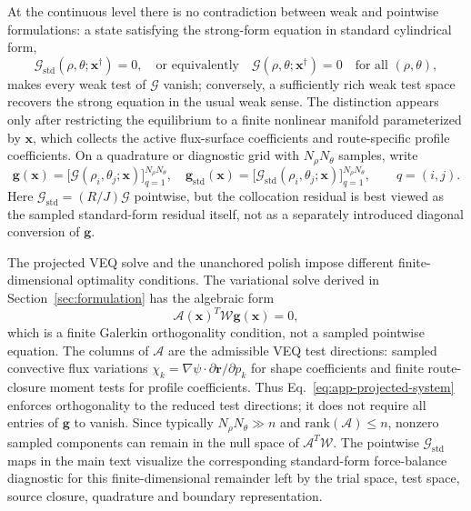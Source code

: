 \documentclass[final, 3p, times]{elsarticle}
\begin{document}
At the continuous level there is no contradiction between weak and pointwise formulations: a state satisfying the strong-form equation in standard cylindrical form,
\begin{equation*}
    \mathcal{G}_{\mathrm{std}}(\rho,\theta;\mathbf{x}^{\dagger})=0,
    \quad \text{or equivalently}\quad
    \mathcal{G}(\rho,\theta;\mathbf{x}^{\dagger})=0
    \quad \text{for all }(\rho,\theta),
\end{equation*}
makes every weak test of $\mathcal{G}$ vanish; conversely, a sufficiently rich weak test space recovers the strong equation in the usual weak sense. The distinction appears only after restricting the equilibrium to a finite nonlinear manifold parameterized by $\mathbf{x}$, which collects the active flux-surface coefficients and route-specific profile coefficients. On a quadrature or diagnostic grid with $N_\rho N_\theta$ samples, write
\begin{equation*}
    \mathbf{g}(\mathbf{x})
    =
    \bigl[\mathcal{G}(\rho_i,\theta_j;\mathbf{x})\bigr]_{q=1}^{N_\rho N_\theta},
    \quad
    \mathbf{g}_{\mathrm{std}}(\mathbf{x})
    =
    \bigl[\mathcal{G}_{\mathrm{std}}(\rho_i,\theta_j;\mathbf{x})\bigr]_{q=1}^{N_\rho N_\theta},
    \qquad q=(i,j).
\end{equation*}
Here $\mathcal{G}_{\mathrm{std}}=(R/J)\mathcal{G}$ pointwise, but the collocation residual is best viewed as the sampled standard-form residual itself, not as a separately introduced diagonal conversion of $\mathbf{g}$.

The projected VEQ solve and the unanchored polish impose different finite-dimensional optimality conditions. The variational solve derived in Section~\ref{sec:formulation} has the algebraic form
\begin{equation}
    \mathcal{A}(\mathbf{x})^{T}\mathcal{W}\mathbf{g}(\mathbf{x})=0,
    \label{eq:app-projected-system}
\end{equation}
which is a finite Galerkin orthogonality condition, not a sampled pointwise equation. The columns of $\mathcal{A}$ are the admissible VEQ test directions: sampled convective flux variations $\chi_k=\nabla\psi\cdot\partial\mathbf{r}/\partial p_k$ for shape coefficients and finite route-closure moment tests for profile coefficients. Thus Eq.~\eqref{eq:app-projected-system} enforces orthogonality to the reduced test directions; it does not require all entries of $\mathbf{g}$ to vanish. Since typically $N_\rho N_\theta\gg n$ and $\mathrm{rank}(\mathcal{A})\le n$, nonzero sampled components can remain in the null space of $\mathcal{A}^{T}\mathcal{W}$. The pointwise $\mathcal{G}_{\mathrm{std}}$ maps in the main text visualize the corresponding standard-form force-balance diagnostic for this finite-dimensional remainder left by the trial space, test space, source closure, quadrature and boundary representation.
\end{document}
